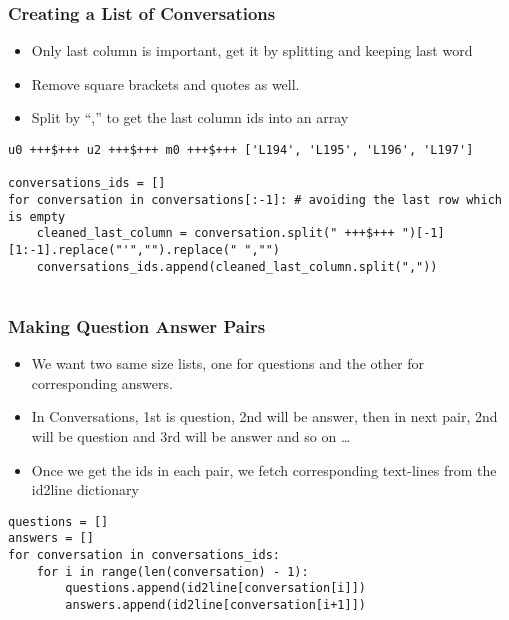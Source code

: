 \begin{frame}[fragile]\frametitle{Creating a List of Conversations}
\begin{itemize}
\item Only last column is important, get it by splitting and keeping last word
\item Remove square brackets and quotes as well.
\item Split by ``,'' to get the last column ids into an array
\end{itemize}


\begin{lstlisting}
u0 +++$+++ u2 +++$+++ m0 +++$+++ ['L194', 'L195', 'L196', 'L197']

conversations_ids = []
for conversation in conversations[:-1]: # avoiding the last row which is empty
    cleaned_last_column = conversation.split(" +++$+++ ")[-1][1:-1].replace("'","").replace(" ","")
    conversations_ids.append(cleaned_last_column.split(","))
        
\end{lstlisting}
\end{frame}

\begin{frame}[fragile]\frametitle{Making Question Answer Pairs}
\begin{itemize}
\item We want two same size lists, one for questions and the other for corresponding answers.
\item In Conversations, 1st is question, 2nd will be answer, then in next pair, 2nd will be question and 3rd will be answer and so on \ldots
\item Once we get the ids in each pair, we fetch corresponding text-lines from the id2line dictionary
\end{itemize}


\begin{lstlisting}
questions = []
answers = []
for conversation in conversations_ids:
    for i in range(len(conversation) - 1):
        questions.append(id2line[conversation[i]])
        answers.append(id2line[conversation[i+1]])
\end{lstlisting}
\end{frame}

